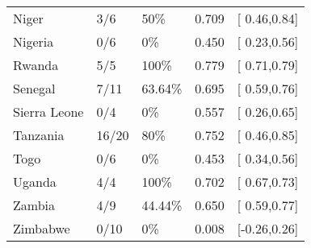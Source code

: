 \begin{table}[ht]
\begin{tabular}{lllrl}
  Niger & 3/6 & 50\% & 0.709 & [ 0.46,0.84] \\ 
  Nigeria & 0/6 & 0\% & 0.450 & [ 0.23,0.56] \\ 
  Rwanda & 5/5 & 100\% & 0.779 & [ 0.71,0.79] \\ 
  Senegal & 7/11 & 63.64\% & 0.695 & [ 0.59,0.76] \\ 
  Sierra Leone & 0/4 & 0\% & 0.557 & [ 0.26,0.65] \\ 
  Tanzania & 16/20 & 80\% & 0.752 & [ 0.46,0.85] \\ 
  Togo & 0/6 & 0\% & 0.453 & [ 0.34,0.56] \\ 
  Uganda & 4/4 & 100\% & 0.702 & [ 0.67,0.73] \\ 
  Zambia & 4/9 & 44.44\% & 0.650 & [ 0.59,0.77] \\ 
  Zimbabwe & 0/10 & 0\% & 0.008 & [-0.26,0.26] \\ 
   \hline
\end{tabular}
\end{table}
